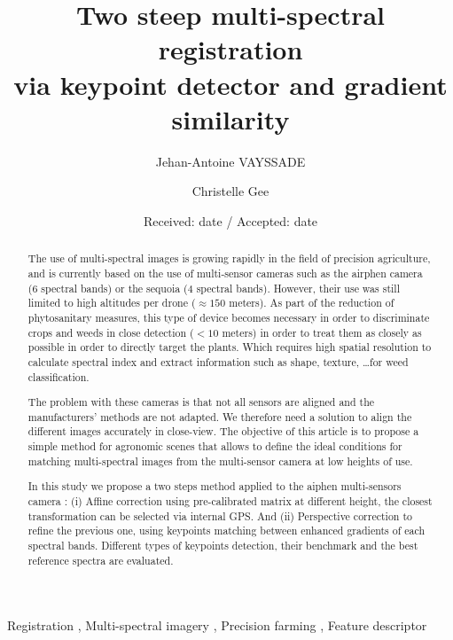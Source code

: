\documentclass[]{elsarticle}
\begin{document}
	
	\onecolumn
	
	\begin{abstract}
		\par The use of multi-spectral images is growing rapidly in the field of precision agriculture,
		and is currently based on the use of multi-sensor cameras such as the airphen camera (6 spectral bands) or the sequoia (4 spectral bands).
		However, their use was still limited to high altitudes per drone ($\approx 150$ meters).
		As part of the reduction of phytosanitary measures,
		this type of device becomes necessary in order to discriminate crops and weeds in close detection ($< 10$ meters)
		in order to treat them as closely as possible in order to directly target the plants.
		Which requires high spatial resolution to calculate spectral index and extract information such as shape, texture, \dots for weed classification.
		\\
		\par The problem with these cameras is that not all sensors are aligned and the manufacturers' methods are not adapted.
		We therefore need a solution to align the different images accurately in close-view.
		The objective of this article is to propose a simple method for agronomic scenes that allows to define the ideal conditions
		for matching multi-spectral images from the multi-sensor camera at low heights of use.
		\\
		\par In this study we propose a two steps method applied to the aiphen multi-sensors camera :
		(i) Affine correction using pre-calibrated matrix at different height, the closest transformation can be selected via internal GPS.
		And (ii) Perspective correction to refine the previous one, using keypoints matching between enhanced gradients of each spectral bands.
		Different types of keypoints detection, their benchmark and the best reference spectra are evaluated.
	\end{abstract}
	
	\begin{keyword}
		Registration \sep
		Multi-spectral imagery \sep
		Precision farming \sep
		Feature descriptor
	\end{keyword}
	
	\begin{frontmatter}
		\title{Two steep multi-spectral registration \\ via keypoint detector and gradient similarity}
		\author[unilu]{Jehan-Antoine VAYSSADE} 
		\author[unilu]{Christelle Gee} 
		\address[myuni]{Agroécologie, AgroSup Dijon, INRA, Univ. Bourgogne, Univ. Bourgogne Franche-Comté,  F-21000 Dijon, France}
		\date{Received: date / Accepted: date}
	\end{frontmatter}
	
\end{document}
